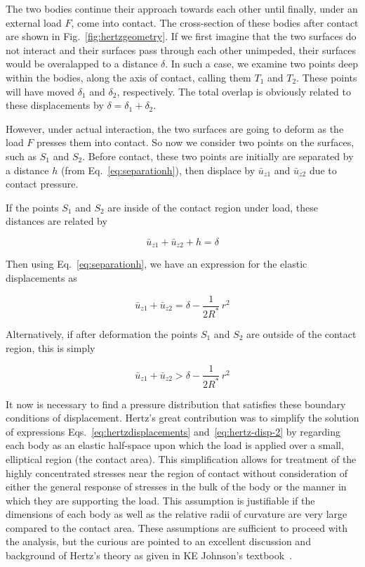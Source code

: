 The two bodies continue their approach towards each other until finally, under an external load $F$, come into contact. The cross-section of these bodies after contact are shown in Fig.~\ref{fig:hertzgeometry}. If we first imagine that the two surfaces do not interact and their surfaces pass through each other unimpeded, their surfaces would be overalapped to a distance $\delta$. In such a case, we examine two points deep within the bodies, along the axis of contact, calling them $T_{1}$ and $T_2$. These points will have moved $\delta_1$ and $\delta_2$, respectively. The total overlap is obviously related to these displacements by $\delta = \delta_1 + \delta_2$. 

However, under actual interaction, the two surfaces are going to deform as the load $F$ presses them into contact. So now we consider two points on the surfaces, such as $S_1$ and $S_2$. Before contact, these two points are initially are separated by a distance $h$ (from Eq.~\ref{eq:separationh}), then displace by $\bar{u}_{z1}$ and $\bar{u}_{z2}$ due to contact pressure. 

If the points $S_1$ and $S_2$ are inside of the contact region under load, these distances are related by

\begin{equation}
	\bar{u}_{z1} + \bar{u}_{z2} + h = \delta
\end{equation}

Then using Eq.~\ref{eq:separationh}, we have an expression for the elastic displacements as

\begin{equation}\label{eq:hertzdisplacements}
	\bar{u}_{z1} + \bar{u}_{z2} = \delta - \frac{1}{2R^*} \, r^2
\end{equation}

Alternatively, if after deformation the points $S_1$ and $S_2$ are outside of the contact region, this is simply

\begin{equation}\label{eq:hertz-disp-2}
	\bar{u}_{z1} + \bar{u}_{z2} > \delta - \frac{1}{2R^*} \, r^2
\end{equation}

It now is necessary to find a pressure distribution that satisfies these boundary conditions of displacement. Hertz's great contribution was to simplify the solution of expressions Eqs.~\ref{eq:hertzdisplacements} and~\ref{eq:hertz-disp-2} by regarding each body as an elastic half-space upon which the load is applied over a small, elliptical region (the contact area). This simplification allows for treatment of the highly concentrated stresses near the region of contact without consideration of either the general response of stresses in the bulk of the body or the manner in which they are supporting the load. This assumption is justifiable if the dimensions of each body as well as the relative radii of curvature are very large compared to the contact area. These assumptions are sufficient to proceed with the analysis, but the curious are pointed to an excellent discussion and background of Hertz's theory as given in KE Johnson's textbook~\cite{Johnson1985}.

